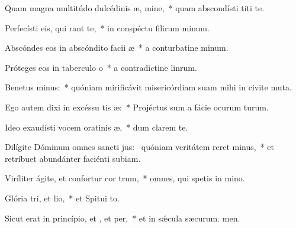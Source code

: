 \item Quam magna multitúdo dulcédinis æ, mine,~* quam abscondísti titi te.
\item Perfecísti eis, qui rant  te,~* in conspéctu filirum minum.
\item Abscóndes eos in abscóndito facii æ~* a conturbatine minum.
\item Próteges eos in taberculo o~* a contradictine linrum.
\item Benetus minus:~* quóniam mirificávit misericórdiam suam mihi in civite muta.
\item Ego autem dixi in excéssu tis æ:~* Projéctus sum a fácie ocurum turum.
\item Ideo exaudísti vocem oratinis æ,~* dum clarem  te.
\item Dilígite Dóminum omnes sancti jus:~\pscross{} quóniam veritátem reret minus,~* et retríbuet abundánter faciénti subiam.
\item Viríliter ágite, et confortur cor trum,~* omnes, qui spetis in mino.
\item Glória tri, et lio,~* et Spitui to.
\item Sicut erat in princípio, et , et per,~* et in sǽcula sæcurum. men.
